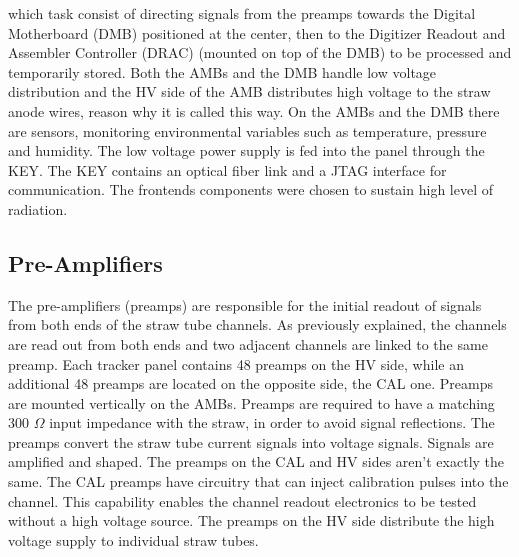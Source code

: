 which task consist of directing signals from the preamps towards the Digital 
Motherboard (DMB) positioned at the center, then to the Digitizer Readout and 
Assembler Controller (DRAC) (mounted on top of the DMB) to be processed and 
temporarily stored. Both the AMBs and the DMB handle low voltage distribution 
and the HV side of the AMB distributes high voltage to the straw anode wires, 
reason why it is called this way. On the AMBs and the DMB there are sensors, 
monitoring environmental variables such as temperature, pressure and humidity. 
The low voltage power supply is fed into the panel through the KEY. The KEY 
contains an optical fiber link and a JTAG interface for communication. The 
frontends components were chosen to sustain high level of radiation.
\subsection{Pre-Amplifiers}
The pre-amplifiers (preamps) are responsible for the initial readout of 
signals from both ends of the straw tube channels. As previously explained, 
the channels are read out from both ends and two adjacent channels are linked 
to the same preamp. Each tracker panel contains 48 preamps on the HV side, 
while an additional 48 preamps are located on the opposite side, the CAL one. 
Preamps are mounted vertically on the AMBs. Preamps are required to have a 
matching 300 $\Omega$ input impedance with the straw, in order to avoid signal 
reflections. The preamps convert the straw tube current signals into voltage signals. 
Signals are amplified and shaped. The preamps on the CAL and HV sides aren't 
exactly the same. The CAL preamps have circuitry that can inject calibration 
pulses into the channel. This capability enables the channel readout electronics 
to be tested without a high voltage source. The preamps on the HV side distribute 
the high voltage supply to individual straw tubes. 
